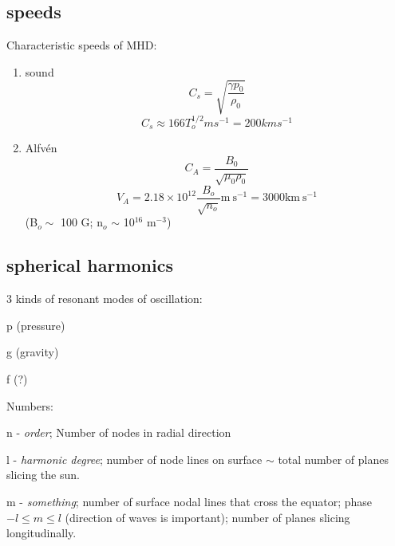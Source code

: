 \documentclass[12pt]{article}
\begin{document}
\subsection*{speeds}
Characteristic speeds of MHD:
\begin{enumerate}
    \item sound
        $$ C_s = \sqrt{\frac{\gamma p_0}{\rho_0}} $$
        $$ C_s \approx 166 T_o^{1/2} m s^{-1} = 200 km s^{-1}$$
    \item Alfv\'en
        $$ C_A = \frac{B_0}{\sqrt{\mu_0\rho_0}} $$
        $$ V_A = 2.18\times10^{12}\frac{B_o}{\sqrt{n_o}}
        \textrm{m}\ \textrm{s}^{-1}
               = 3000 \textrm{km}\ \textrm{s}^{-1} $$
               (B$_o \sim$ 100 G; n$_o$ $\sim$ 10$^{16}$ m$^{-3}$)
\end{enumerate}

\subsection*{spherical harmonics}
3 kinds of resonant modes of oscillation:
\begin{itemize*}
    \item p (pressure)
    \item g (gravity)
    \item f (?)
\end{itemize*}
Numbers:
\begin{itemize*}
    \item n - \emph{order}; Number of nodes in radial direction
    \item l - \emph{harmonic degree}; number of node lines on
        surface $\sim$ total number of planes slicing the sun.
    \item m - \emph{something}; number of surface nodal lines that
        cross the equator; phase\\
        $-l \leq m \leq l$ (direction of waves is important); number of
        planes slicing longitudinally.
\end{itemize*}
\end{document}
